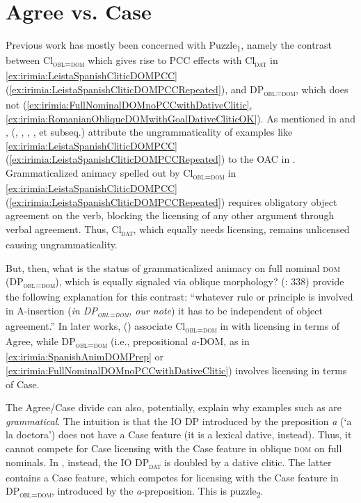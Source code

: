 \documentclass[output=paper,colorlinks,citecolor=brown,draft,draftmode]{langscibook}
\begin{document}
\z

\section{Agree vs. Case} \label{sec:irimia:Section4SAgreeCase}
\largerpage
Previous work has mostly been concerned with Puzzle\textsubscript{1}, namely the contrast between Cl\textsubscript{\textsc{obl=dom}} which gives rise to \textsc{PCC} effects with Cl\textsubscript{\textsc{dat}} in \ref{ex:irimia:LeistaSpanishCliticDOMPCC} (\ref{ex:irimia:LeistaSpanishCliticDOMPCCRepeated}), and DP\textsubscript{\textsc{obl=dom}}, which does not (\ref{ex:irimia:FullNominalDOMnoPCCwithDativeClitic}, \ref{ex:irimia:RomanianObliqueDOMwithGoalDativeCliticOK}). As mentioned in  and , \citeauthor{ormromero07} (\citeyear{ormromero07}, \citeyear{ormromero13}, \citeyear{OrmRomero2013c}, \citeyear{OrmRomero2013b}, et subseq.) attribute the ungrammaticality of examples like \ref{ex:irimia:LeistaSpanishCliticDOMPCC} (\ref{ex:irimia:LeistaSpanishCliticDOMPCCRepeated}) to the OAC in . Grammaticalized animacy spelled out by Cl\textsubscript{\textsc{obl=dom}} in  \ref{ex:irimia:LeistaSpanishCliticDOMPCC} (\ref{ex:irimia:LeistaSpanishCliticDOMPCCRepeated}) requires obligatory object agreement on the verb, blocking the licensing of any other argument through verbal agreement. Thus, Cl\textsubscript{\textsc{dat}}, which equally needs licensing, remains unlicensed causing ungrammaticality.

But, then, what is the status of grammaticalized animacy on full nominal \textsc{dom} (DP\textsubscript{\textsc{obl=dom}}), which is equally signaled via oblique morphology? \citeauthor{ormromero07} (\citeyear{ormromero07}: 338) provide the following explanation for this contrast: ``whatever rule or principle is involved in A-insertion (\textit{in DP\textsubscript{\textsc{obl=dom}}, our note}) it has to be independent of object agreement.'' In later works, \citeauthor{ormromero13} (\citeyear{ormromero13}) associate Cl\textsubscript{\textsc{obl=dom}} in  with licensing in terms of Agree, while DP\textsubscript{\textsc{obl=dom}} (i.e., prepositional \textit{a-}\textsc{DOM}, as in \ref{ex:irimia:SpanishAnimDOMPrep} or \ref{ex:irimia:FullNominalDOMnoPCCwithDativeClitic}) involves licensing in terms of Case.

The Agree/Case divide can also, potentially, explain why examples such as  are \textit{grammatical}. The intuition is that the IO DP introduced by the preposition \textit{a} (`a la doctora') does not have a Case feature (it is a lexical dative, instead). Thus, it cannot compete for Case licensing with the Case feature in oblique \textsc{dom} on full nominals. In , instead, the IO DP\textsubscript{\textsc{dat}} is doubled by a dative clitic. The latter contains a Case feature, which competes for licensing with the Case feature in DP\textsubscript{\textsc{obl=dom}}, introduced by the \textit{a}-preposition. This is {puzzle}\textsubscript{2}.
\end{document}
